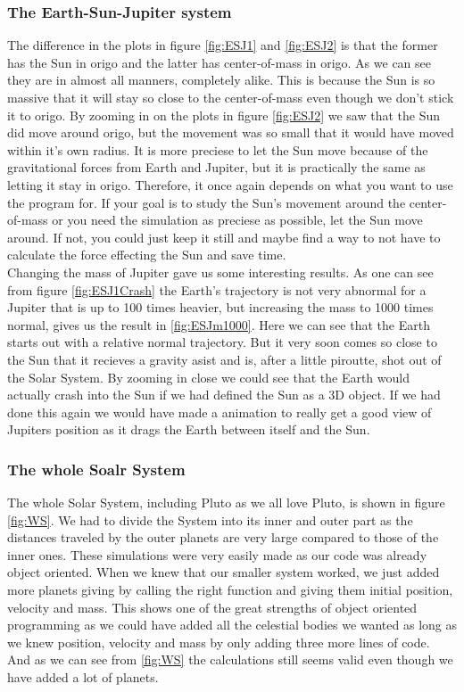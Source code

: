 \documentclass{article}
\begin{document}
\subsubsection*{The Earth-Sun-Jupiter system}
The difference in the plots in figure \ref{fig:ESJ1} and \ref{fig:ESJ2} is that the former has the Sun in origo and the latter has center-of-mass in origo. As we can see they are in almost all manners, completely alike. This is because the Sun is so massive that it will stay so close to the center-of-mass even though we don't stick it to origo. By zooming in on the plots in figure \ref{fig:ESJ2} we saw that the Sun did move around origo, but the movement was so small that it would have moved within it's own radius. It is more preciese to let the Sun move because of the gravitational forces from Earth and Jupiter, but it is practically the same as letting it stay in origo. Therefore, it once again depends on what you want to use the program for. If your goal is to study the Sun's movement around the center-of-mass or you need the simulation as preciese as possible, let the Sun move around. If not, you could just keep it still and maybe find a way to not have to calculate the force effecting the Sun and save time. \\

Changing the mass of Jupiter gave us some interesting results. As one can see from figure \ref{fig:ESJ1Crash} the Earth's trajectory is not very abnormal for a Jupiter that is up to 100 times heavier, but increasing the mass to 1000 times normal, gives us the result in \ref{fig:ESJm1000}. Here we can see that the Earth starts out with a relative normal trajectory. But it very soon comes so close to the Sun that it recieves a gravity asist and is, after a little piroutte, shot out of the Solar System. By zooming in close we could see that the Earth would actually crash into the Sun if we had defined the Sun as a 3D object. If we had done this again we would  have made a animation to really get a good view of Jupiters position as it drags the Earth between itself and the Sun.
\subsubsection*{The whole Soalr System}
The whole Solar System, including Pluto as we all love Pluto, is shown in figure \ref{fig:WS}. We had to divide the System into its inner and outer part as the distances traveled by the outer planets are very large compared to those of the inner ones. These simulations were very easily made as our code was already object oriented. When we knew that our smaller system worked, we just added more planets giving by calling the right function and giving them initial position, velocity and mass. This shows one of the great strengths of object oriented programming as we could have added all the celestial bodies we wanted as long as we knew position, velocity and mass by only adding three more lines of code. And as we can see from \ref{fig:WS} the calculations still seems valid even though we have added a lot of planets.
\end{document}
